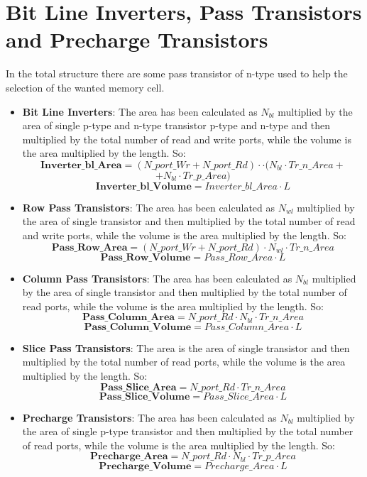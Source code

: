 \section{Bit Line Inverters, Pass Transistors \\and Precharge Transistors}
In the total structure there are some pass transistor of n-type used to help the selection of the wanted memory cell.
\begin{itemize}
\item{\textbf{Bit Line Inverters}}:
The area has been calculated as $N_{bl}$ multiplied by the area of single p-type and n-type transistor p-type and n-type and then multiplied by the total number of read and write ports, while the volume is the area multiplied by the length. So:
	\[
	\textbf{Inverter\_bl\_Area} = (N\_port\_Wr+N\_port\_Rd) \cdot \cdot (N_{bl} \cdot Tr\_n\_Area +
	\]
	\[
	+ N_{bl} \cdot Tr\_p\_Area)
	\]
	\[
	\textbf{Inverter\_bl\_Volume} = Inverter\_bl\_Area \cdot L
	\]

\item{\textbf{Row Pass Transistors}}:
The area has been calculated as $N_{wl}$ multiplied by the area of single transistor and then multiplied by the total number of read and write ports, while the volume is the area multiplied by the length. So:
	\[
	\textbf{Pass\_Row\_Area} = (N\_port\_Wr+N\_port\_Rd) \cdot N_{wl} \cdot Tr\_n\_Area
	\]
	\[
	\textbf{Pass\_Row\_Volume} = Pass\_Row\_Area \cdot L
	\]
\item{\textbf{Column Pass Transistors}}:
The area has been calculated as $N_{bl}$ multiplied by the area of single transistor and then multiplied by the total number of read ports, while the volume is the area multiplied by the length. So: 
	\[
	\textbf{Pass\_Column\_Area} = N\_port\_Rd \cdot N_{bl} \cdot Tr\_n\_Area
	\]
	\[
	\textbf{Pass\_Column\_Volume} = Pass\_Column\_Area \cdot L
	\]
\item{\textbf{Slice Pass Transistors}}:
The area is the area of single transistor and then multiplied by the total number of read ports, while the volume is the area multiplied by the length. So:
	\[
	\textbf{Pass\_Slice\_Area} = N\_port\_Rd \cdot Tr\_n\_Area
	\]
	\[
	\textbf{Pass\_Slice\_Volume} = Pass\_Slice\_Area \cdot L
	\]
\item{\textbf{Precharge Transistors}}:
The area has been calculated as $N_{bl}$ multiplied by the area of single p-type transistor and then multiplied by the total number of read ports, while the volume is the area multiplied by the length. So:
	\[
	\textbf{Precharge\_Area} = N\_port\_Rd \cdot N_{bl} \cdot Tr\_p\_Area
	\]
	\[
	\textbf{Precharge\_Volume} = Precharge\_Area \cdot L
	\]
\end{itemize}

